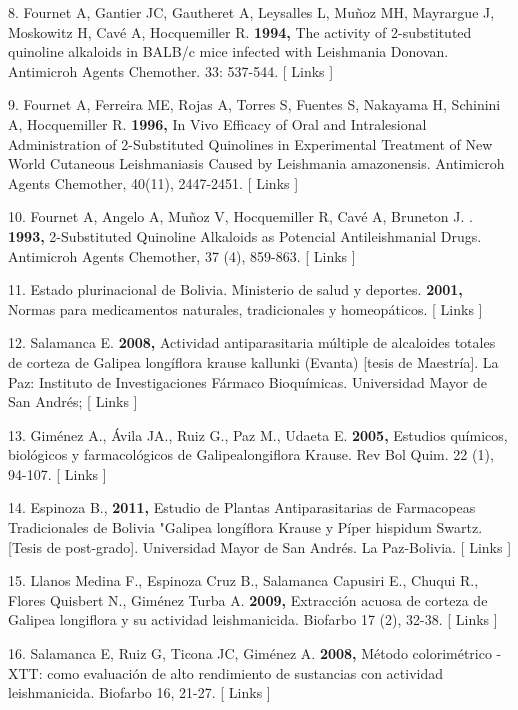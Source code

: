 \documentclass{article}
\begin{document}
8. Fournet A, Gantier JC, Gautheret A, Leysalles L, Muñoz MH, Mayrargue J,
Moskowitz H, Cavé A, Hocquemiller R. \textbf{1994, }
The activity of 2-substituted quinoline alkaloids in BALB/c mice infected with
Leishmania Donovan. Antimicroh Agents Chemother. 33: 537-544. [ Links ]

9. Fournet A, Ferreira ME, Rojas A, Torres S, Fuentes S, Nakayama H, Schinini A,
Hocquemiller R. \textbf{1996, }
In Vivo Efficacy of Oral and Intralesional Administration of 2-Substituted
Quinolines in Experimental Treatment of New World Cutaneous Leishmaniasis Caused
by Leishmania amazonensis. Antimicroh Agents Chemother, 40(11), 2447-2451. [
Links ]

10. Fournet A, Angelo A, Muñoz V, Hocquemiller R, Cavé A, Bruneton J. .
\textbf{1993, }
2-Substituted Quinoline Alkaloids as Potencial Antileishmanial Drugs. Antimicroh
Agents Chemother, 37 (4), 859-863. [ Links ]

11. Estado plurinacional de Bolivia. Ministerio de salud y deportes.
\textbf{2001, }
Normas para medicamentos naturales, tradicionales y homeopáticos. [ Links ]

12. Salamanca E. \textbf{2008, }
Actividad antiparasitaria múltiple de alcaloides totales de corteza de Galipea
longíflora krause kallunki (Evanta) [tesis de Maestría]. La Paz: Instituto de
Investigaciones Fármaco Bioquímicas. Universidad Mayor de San Andrés; [ Links ]

13. Giménez A., Ávila JA., Ruiz G., Paz M., Udaeta E. \textbf{2005, }
Estudios químicos, biológicos y farmacológicos de Galipealongiflora Krause. Rev
Bol Quim. 22 (1), 94-107. [ Links ]

14. Espinoza B., \textbf{2011, }
Estudio de Plantas Antiparasitarias de Farmacopeas Tradicionales de Bolivia
"Galipea longíflora Krause y Píper hispidum Swartz. [Tesis de post-grado].
Universidad Mayor de San Andrés. La Paz-Bolivia. [ Links ]

15. Llanos Medina F., Espinoza Cruz B., Salamanca Capusiri E., Chuqui R., Flores
Quisbert N., Giménez Turba A. \textbf{2009, }
Extracción acuosa de corteza de Galipea longiflora y su actividad leishmanicida.
Biofarbo 17 (2), 32-38. [ Links ]

16. Salamanca E, Ruiz G, Ticona JC, Giménez A. \textbf{2008, }
Método colorimétrico - XTT: como evaluación de alto rendimiento de sustancias
con actividad leishmanicida. Biofarbo 16, 21-27. [ Links ]
\end{document}
